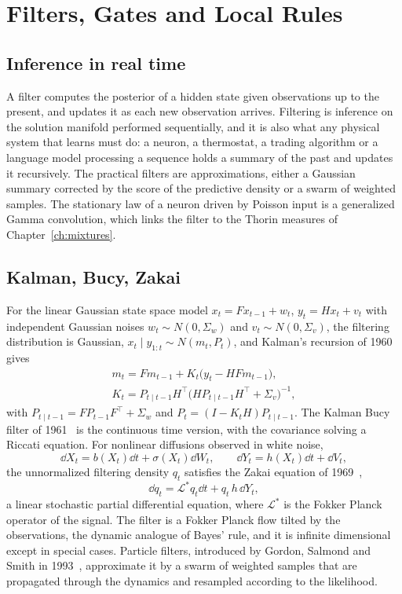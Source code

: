 \chapter{Filters, Gates and Local Rules}
\label{ch:filters}

\section{Inference in real time}

A filter computes the posterior of a hidden state given observations up to the present, and updates it as each new observation arrives. Filtering is inference on the solution manifold performed sequentially, and it is also what any physical system that learns must do: a neuron, a thermostat, a trading algorithm or a language model processing a sequence holds a summary of the past and updates it recursively. The practical filters are approximations, either a Gaussian summary corrected by the score of the predictive density or a swarm of weighted samples. The stationary law of a neuron driven by Poisson input is a generalized Gamma convolution, which links the filter to the Thorin measures of Chapter~\ref{ch:mixtures}.

\section{Kalman, Bucy, Zakai}

For the linear Gaussian state space model $x_t = Fx_{t-1}+w_t$, $y_t = Hx_t+v_t$ with independent Gaussian noises $w_t\sim N(0,\Sigma_w)$ and $v_t\sim N(0,\Sigma_v)$, the filtering distribution is Gaussian, $x_t\mid y_{1:t}\sim N(m_t,P_t)$, and Kalman's recursion of 1960~\cite{kalman1960} gives
\begin{gather*}
m_t = Fm_{t-1}+K_t\big(y_t-HFm_{t-1}\big), \\
K_t = P_{t\mid t-1}H^\top\big(HP_{t\mid t-1}H^\top+\Sigma_v\big)^{-1},
\end{gather*}
with $P_{t\mid t-1} = FP_{t-1}F^\top+\Sigma_w$ and $P_t = (I-K_tH)P_{t\mid t-1}$. The Kalman Bucy filter of 1961~\cite{kalmanbucy1961} is the continuous time version, with the covariance solving a Riccati equation. For nonlinear diffusions observed in white noise,
\[
\dd X_t = b(X_t)\dd t+\sigma(X_t)\dd W_t,\qquad\dd Y_t = h(X_t)\dd t+\dd V_t,
\]
the unnormalized filtering density $q_t$ satisfies the Zakai equation of 1969~\cite{zakai1969},
\[
\dd q_t = \mathcal{L}^*q_t\dd t+q_t\,h\,\dd Y_t,
\]
a linear stochastic partial differential equation, where $\mathcal{L}^*$ is the Fokker Planck operator of the signal. The filter is a Fokker Planck flow tilted by the observations, the dynamic analogue of Bayes' rule, and it is infinite dimensional except in special cases. Particle filters, introduced by Gordon, Salmond and Smith in 1993~\cite{gss1993}, approximate it by a swarm of weighted samples that are propagated through the dynamics and resampled according to the likelihood.

